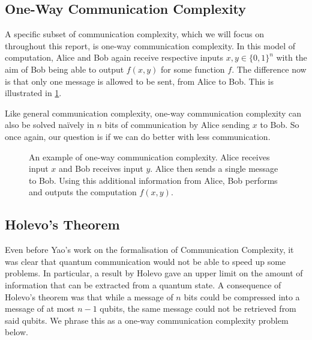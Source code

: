 \documentclass[a4paper]{article}
\begin{document}
        \subsection{One-Way Communication Complexity}

        A specific subset of communication complexity, which we will focus on throughout this report, is one-way communication complexity. In this model of computation, Alice and Bob again receive respective inputs $x, y \in \{0, 1\}^n$ with the aim of Bob being able to output $f(x, y)$ for some function $f$. The difference now is that only one message is allowed to be sent, from Alice to Bob. This is illustrated in \ref{fig:ow-cc}.

        Like general communication complexity, one-way communication complexity can also be solved na\"{i}vely in $n$ bits of communication by Alice sending $x$ to Bob. So once again, our question is if we can do better with less communication.

        \begin{figure}
            \centering
            \caption{An example of one-way communication complexity. Alice receives input $x$ and Bob receives input $y$. Alice then sends a single message to Bob. Using this additional information from Alice, Bob performs and outputs the computation $f(x, y)$.}
            \label{fig:ow-cc}
        \end{figure}

        \subsection{Holevo's Theorem}

        Even before Yao's work on the formalisation of Communication Complexity, it was clear that quantum communication would not be able to speed up some problems. In particular, a result by Holevo \cite{Hol73} gave an upper limit on the amount of information that can be extracted from a quantum state. A consequence of Holevo's theorem was that while a message of $n$ bits could be compressed into a message of at most $n-1$ qubits, the same message could not be retrieved from said qubits. We phrase this as a one-way communication complexity problem below.
\end{document}
